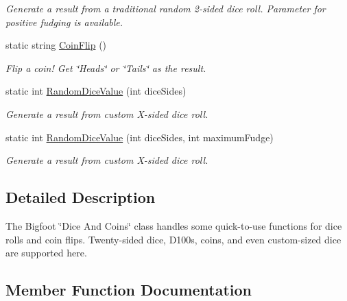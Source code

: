 \begin{DoxyCompactItemize}
\begin{DoxyCompactList}\small\item\em Generate a result from a traditional random 2-\/sided dice roll. Parameter for positive fudging is available. \end{DoxyCompactList}\item 
static string \mbox{\hyperlink{class_bigfoot_d_s_1_1_bigfoot_dice_and_coins_a5ed19ba2f5fce701530919461301f08f}{Coin\+Flip}} ()
\begin{DoxyCompactList}\small\item\em Flip a coin! Get \char`\"{}\+Heads\char`\"{} or \char`\"{}\+Tails\char`\"{} as the result. \end{DoxyCompactList}\item 
static int \mbox{\hyperlink{class_bigfoot_d_s_1_1_bigfoot_dice_and_coins_a6d6665f7273e50d5971dcd4aaa1c371e}{Random\+Dice\+Value}} (int dice\+Sides)
\begin{DoxyCompactList}\small\item\em Generate a result from custom X-\/sided dice roll. \end{DoxyCompactList}\item 
static int \mbox{\hyperlink{class_bigfoot_d_s_1_1_bigfoot_dice_and_coins_acd7f9d81c931fdfcf2c493d900e0ee45}{Random\+Dice\+Value}} (int dice\+Sides, int maximum\+Fudge)
\begin{DoxyCompactList}\small\item\em Generate a result from custom X-\/sided dice roll. \end{DoxyCompactList}\end{DoxyCompactItemize}


\subsection{Detailed Description}
The Bigfoot \char`\"{}\+Dice And Coins\char`\"{} class handles some quick-\/to-\/use functions for dice rolls and coin flips. Twenty-\/sided dice, D100s, coins, and even custom-\/sized dice are supported here. 



\subsection{Member Function Documentation}
\mbox{\label{class_bigfoot_d_s_1_1_bigfoot_dice_and_coins_a5ed19ba2f5fce701530919461301f08f}} 
